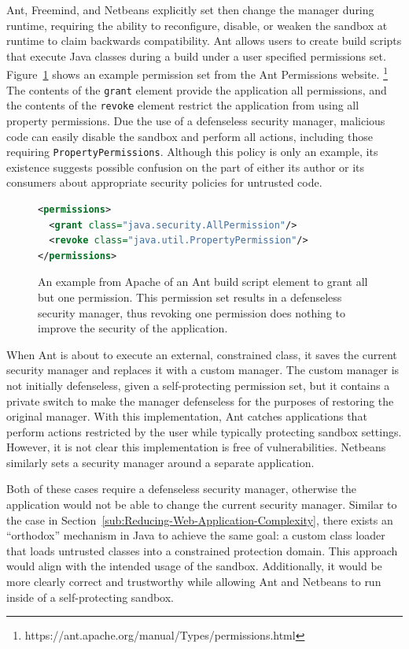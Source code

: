 \documentclass{sig-alternate}
\begin{document}
Ant, Freemind, and Netbeans explicitly set then change the manager
during runtime, requiring the ability to reconfigure, disable,
or weaken the sandbox at runtime to claim backwards
compatibility. Ant allows users to create build scripts that 
execute Java classes during a build under a user specified
permissions set. Figure~\ref{fig:Ant Permissions Example}
shows an example permission set from the Ant Permissions website.%
\footnote{https://ant.apache.org/manual/Types/permissions.html%
} The contents of the \texttt{grant} element provide the application
all permissions, and the contents of the \texttt{revoke} element restrict
the application from using all property permissions. Due the use of a
defenseless security manager, malicious code can easily disable the sandbox and perform all actions,
including those requiring \texttt{PropertyPermissions}.  Although this policy is
only an example, its existence suggests possible confusion on the part of either its author
or its consumers about appropriate security policies for untrusted code.

\begin{figure}
\begin{lstlisting}[language=XML,basicstyle={\scriptsize}]
<permissions>   
  <grant class="java.security.AllPermission"/>   
  <revoke class="java.util.PropertyPermission"/> 
</permissions>
\end{lstlisting}

\caption{An example from Apache of an Ant build script element to grant all but one permission. This permission set results in a defenseless security manager, thus revoking one permission does nothing to improve the security of the application.}
\label{fig:Ant Permissions Example}
\end{figure}

When Ant is about to execute an external, constrained class, it saves the
current security manager and replaces it with a custom manager. The custom
manager is not initially defenseless, given a self-protecting permission set, but
it contains a private switch to make the manager defenseless for the purposes of
restoring the original manager. With this implementation, Ant catches
applications that perform actions restricted by the user while typically
protecting sandbox settings. However, it is not clear this implementation is
free of vulnerabilities. Netbeans similarly sets a security manager around a
separate application.

Both of these cases require a defenseless security manager, otherwise
the application would not be able to change the current security manager. 
Similar to the case in Section~\ref{sub:Reducing-Web-Application-Complexity},
there exists an ``orthodox'' mechanism in Java to achieve the same goal: a custom class
loader that loads untrusted classes into a constrained protection
domain.  This approach would align with the intended usage of the sandbox.
Additionally, it would be more clearly correct and trustworthy while
allowing Ant and Netbeans to run inside of a self-protecting sandbox.
\end{document}

